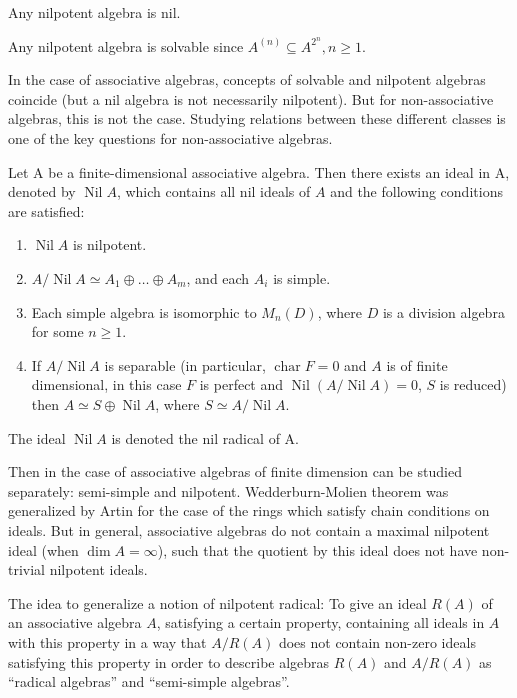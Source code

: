 \documentclass{article}
\begin{document}
Any nilpotent algebra is nil.

Any nilpotent algebra is solvable since $ A^{(n )} \subseteq A^{2^n} , n\ge 1$.

In the case of associative algebras, concepts of solvable and nilpotent algebras coincide (but a nil algebra is not necessarily nilpotent). But for non-associative algebras, this is not the case.  
Studying relations between these different classes is one of the key questions for non-associative algebras.  

\begin{theorem}  
Let A be a finite-dimensional associative algebra. Then there exists an ideal in A, denoted by $\operatorname{Nil} A$, which contains all nil ideals of $A$ and the following conditions are satisfied:  
\begin{enumerate}  
    \item $\operatorname{Nil} A$ is nilpotent.  
    \item $A / \operatorname{Nil} A \simeq A_1 \oplus \dots \oplus A_m$, and each $A_i$ is simple.  
    \item Each simple algebra is isomorphic to $M_n(D)$, where $D$ is a division algebra for some $n \ge 1$.  
    \item If $A / \operatorname{Nil} A$ is separable (in particular, $ \operatorname{char}F=0 $ and $ A $ is of finite dimensional, in this case $ F $ is perfect and $ \operatorname{Nil}(A/\operatorname{Nil}A)=0 $, $ S $ is reduced) then $A \simeq S \oplus \operatorname{Nil} A$, where $S \simeq A / \operatorname{Nil} A$.  
\end{enumerate}  
The ideal $\operatorname{Nil} A$ is denoted the nil radical of A.
\end{theorem}  

Then in the case of associative algebras of finite dimension can be studied separately: semi-simple and nilpotent.  
Wedderburn-Molien theorem was generalized by Artin for the case of the rings which satisfy chain conditions on ideals. But in general, associative algebras do not contain a maximal nilpotent ideal (when $ \dim A = \infty $), such that the quotient by this ideal does not have non-trivial nilpotent ideals.  

The idea to generalize a notion of nilpotent radical:  
To give an ideal $R(A)$ of an associative algebra $A$, satisfying a certain property, containing all ideals in $A$ with this property in a way that $A/R(A)$ does not contain non-zero ideals satisfying this property in order to describe algebras $R(A)$ and $A/R(A)$ as ``radical algebras'' and ``semi-simple algebras''.  
\end{document}
